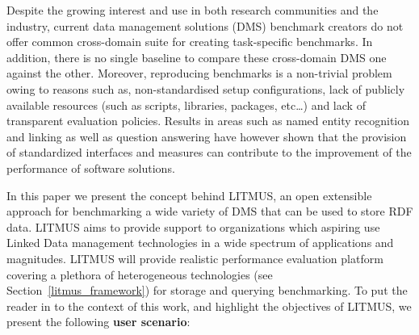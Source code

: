 \documentclass{llncs}
\begin{document}
Despite the growing interest and use in both research communities and the industry, current data management solutions (DMS) benchmark creators \cite{bizer2009berlin,alucc2014diversified} do not offer common cross-domain suite for creating task-specific benchmarks. In addition, there is no single baseline to compare these cross-domain DMS one against the other. 
Moreover, reproducing benchmarks is a non-trivial problem owing to reasons such as, non-standardised setup configurations, lack of publicly available resources (such as scripts, libraries, packages, etc\dots) and lack of transparent evaluation policies. 
Results in areas such as named entity recognition and linking \cite{gerbil} as well as question answering \cite{qald,bioasq} have however shown that the provision of standardized interfaces and measures can contribute to the improvement of the performance of software solutions.
    
In this paper we present the concept behind LITMUS, an open extensible approach for benchmarking a wide variety of DMS that can be used to store RDF data. 
LITMUS aims to provide support to organizations which aspiring use Linked Data management technologies in a wide spectrum of applications and magnitudes. 
LITMUS will provide realistic performance evaluation platform covering a plethora of heterogeneous technologies (see Section~\ref{litmus_framework}) for storage and querying benchmarking. 
To put the reader in to the context of this work, and highlight the objectives of LITMUS, we present the following \textbf{user scenario}: 
    
\end{document}

